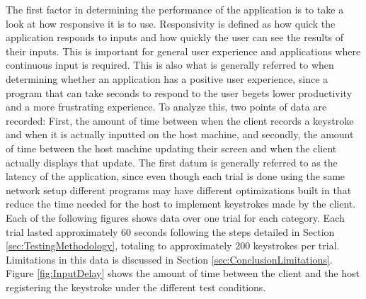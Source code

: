 The first factor in determining the performance of the application is to take a look at how responsive it is to use.
Responsivity is defined as how quick the application responds to inputs and how quickly the user can see the results of their inputs.
This is important for general user experience and applications where continuous input is required.
This is also what is generally referred to when determining whether an application has a positive user experience, since a program that can take seconds to respond to the user begets lower productivity and a more frustrating experience.
To analyze this, two points of data are recorded: First, the amount of time between when the client records a keystroke and when it is actually inputted on the host machine, and secondly, the amount of time between the host machine updating their screen and when the client actually displays that update.
The first datum is generally referred to as the latency of the application, since even though each trial is done using the same network setup different programs may have different optimizations built in that reduce the time needed for the host to implement keystrokes made by the client.
Each of the following figures shows data over one trial for each category.
Each trial lasted approximately 60 seconds following the steps detailed in Section \ref{sec:TestingMethodology}, totaling to approximately 200 keystrokes per trial.
Limitations in this data is discussed in Section \ref{sec:ConclusionLimitations}.
Figure \ref{fig:InputDelay} shows the amount of time between the client and the host registering the keystroke under the different test conditions.

